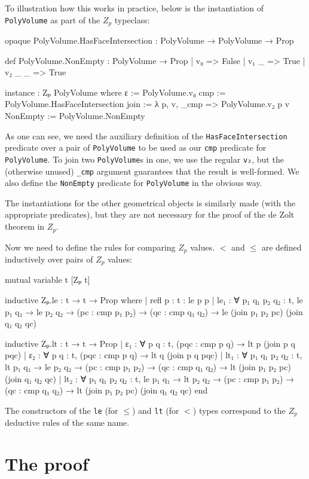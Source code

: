 \documentclass[12pt]{article} %
\newcommand{\leanline}[1]{\texttt{#1}} %
\newcommand{\pvolume}{\texttt{PolyVolume}} %
\newcommand{\zp}{\ensuremath{Z_{p}}}
\begin{document}
To illustration how this works in practice, below is the instantiation of \pvolume{} as part of the \zp{} typeclass: %
\begin{leancode}
opaque PolyVolume.HasFaceIntersection
  : PolyVolume → PolyVolume → Prop

def PolyVolume.NonEmpty : PolyVolume → Prop
| v₀ => False
| v₁ _ => True
| v₂ _ _ => True

instance : Zₚ PolyVolume where
  ε := PolyVolume.v₀
  cmp := PolyVolume.HasFaceIntersection
  join := λ p, v, _cmp => PolyVolume.v₂ p v
  NonEmpty := PolyVolume.NonEmpty
\end{leancode}
As one can see, we need the auxiliary definition of the \leanline{HasFaceIntersection} predicate over a pair of \pvolume{} to be used as our \leanline{cmp} predicate for \pvolume. %
To join two \pvolume{}s in one, we use the regular \leanline{v₂}, but the (otherwise unused) \leanline{_cmp} argument guarantees that the result is well-formed. %
We also define the \leanline{NonEmpty} predicate for \pvolume{} in the obvious way. %

The instantiations for the other geometrical objects is similarly made (with the appropriate predicates), but they are not necessary for the proof of the de Zolt theorem in \zp. %

Now we need to define the rules for comparing \zp{} values. %
\(<\) and \(\leq\) are defined inductively over pairs of \zp{} values: %
\begin{leancode}
mutual
  variable {t} [Zₚ t]

  inductive Zₚ.le : t → t → Prop where
  | refl {p : t} : le p p
  | le₁ : ∀ {p₁ q₁ p₂ q₂ : t}, le p₁ q₁ → le p₂ q₂
        → (pc : cmp p₁ p₂) → (qc : cmp q₁ q₂)
        → le (join p₁ p₂ pc) (join q₁ q₂ qc)

  inductive Zₚ.lt : t → t → Prop
  | ε₁ : ∀ {p q : t}, (pqc : cmp p q) → lt p (join p q pqc)
  | ε₂ : ∀ {p q : t}, (pqc : cmp p q) → lt q (join p q pqc)
  | lt₁ : ∀ {p₁ q₁ p₂ q₂ : t}, lt p₁ q₁ → le p₂ q₂
        → (pc : cmp p₁ p₂) → (qc : cmp q₁ q₂)
        → lt (join p₁ p₂ pc) (join q₁ q₂ qc)
  | lt₂ : ∀ {p₁ q₁ p₂ q₂ : t}, le p₁ q₁ → lt p₂ q₂
        → (pc : cmp p₁ p₂) → (qc : cmp q₁ q₂)
        → lt (join p₁ p₂ pc) (join q₁ q₂ qc)
end
\end{leancode}
The constructors of the \leanline{le} (for \(\leq\)) and \leanline{lt} (for \(<\)) types correspond to the \zp{} deductive rules of the same name. %

\section{The proof}\label{sec:de-zolt-theorem} %
\end{document}
